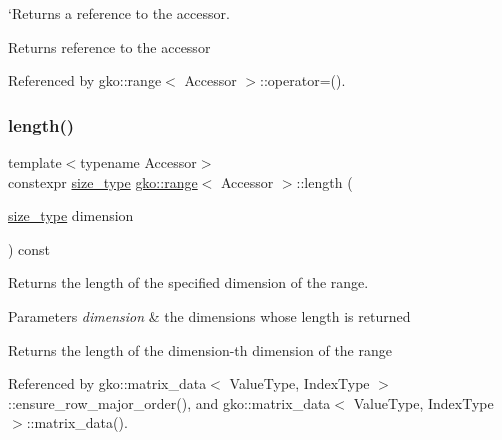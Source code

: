`\+Returns a reference to the accessor. 

\begin{DoxyReturn}{Returns}
reference to the accessor 
\end{DoxyReturn}


Referenced by gko\+::range$<$ Accessor $>$\+::operator=().

\mbox{\label{classgko_1_1range_a3ac8b238c377da9cc05d7c728efabfc8}} 
\subsubsection{\texorpdfstring{length()}{length()}}
{\footnotesize\ttfamily template$<$typename Accessor$>$ \\
constexpr \hyperlink{namespacegko_a6e5c95df0ae4e47aab2f604a22d98ee7}{size\+\_\+type} \hyperlink{classgko_1_1range}{gko\+::range}$<$ Accessor $>$\+::length (\begin{DoxyParamCaption}\item[{\hyperlink{namespacegko_a6e5c95df0ae4e47aab2f604a22d98ee7}{size\+\_\+type}}]{dimension }\end{DoxyParamCaption}) const\hspace{0.3cm}{\ttfamily [inline]}}



Returns the length of the specified dimension of the range. 


\begin{DoxyParams}{Parameters}
{\em dimension} & the dimensions whose length is returned\\
\hline
\end{DoxyParams}
\begin{DoxyReturn}{Returns}
the length of the {\ttfamily dimension}-\/th dimension of the range 
\end{DoxyReturn}


Referenced by gko\+::matrix\+\_\+data$<$ Value\+Type, Index\+Type $>$\+::ensure\+\_\+row\+\_\+major\+\_\+order(), and gko\+::matrix\+\_\+data$<$ Value\+Type, Index\+Type $>$\+::matrix\+\_\+data().

\mbox{\label{classgko_1_1range_a3ac230f10fa217dbb46475ea38243573}} 
